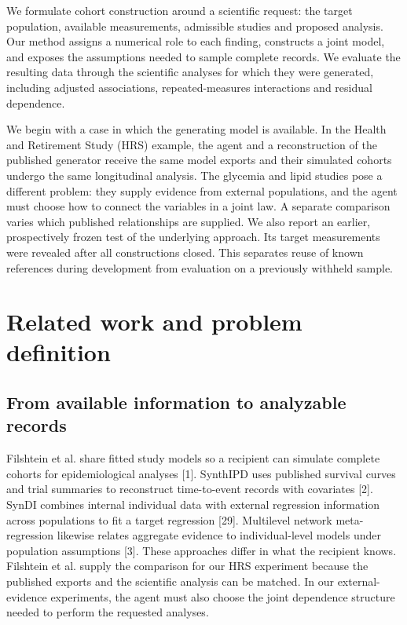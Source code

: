 \documentclass[sigconf,anonymous,review]{acmart}
\begin{document}
We formulate cohort construction around a scientific request: the target population, available measurements, admissible studies and proposed analysis. Our method assigns a numerical role to each finding, constructs a joint model, and exposes the assumptions needed to sample complete records. We evaluate the resulting data through the scientific analyses for which they were generated, including adjusted associations, repeated-measures interactions and residual dependence.


We begin with a case in which the generating model is available. In the Health and Retirement Study (HRS) example, the agent and a reconstruction of the published generator receive the same model exports and their simulated cohorts undergo the same longitudinal analysis. The glycemia and lipid studies pose a different problem: they supply evidence from external populations, and the agent must choose how to connect the variables in a joint law. A separate comparison varies which published relationships are supplied. We also report an earlier, prospectively frozen test of the underlying approach. Its target measurements were revealed after all constructions closed. This separates reuse of known references during development from evaluation on a previously withheld sample.


\section{Related work and problem definition}

\subsection{From available information to analyzable records}

Filshtein et al. share fitted study models so a recipient can simulate complete cohorts for epidemiological analyses [1]. SynthIPD uses published survival curves and trial summaries to reconstruct time-to-event records with covariates [2]. SynDI combines internal individual data with external regression information across populations to fit a target regression [29]. Multilevel network meta-regression likewise relates aggregate evidence to individual-level models under population assumptions [3]. These approaches differ in what the recipient knows. Filshtein et al. supply the comparison for our HRS experiment because the published exports and the scientific analysis can be matched. In our external-evidence experiments, the agent must also choose the joint dependence structure needed to perform the requested analyses.
\end{document}
